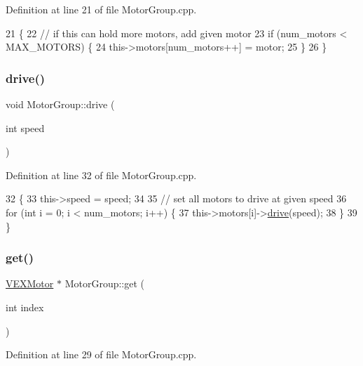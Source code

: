 Definition at line 21 of file Motor\+Group.\+cpp.


\begin{DoxyCode}
21                                     \{
22     \textcolor{comment}{// if this can hold more motors, add given motor}
23     \textcolor{keywordflow}{if} (num\_motors < MAX\_MOTORS) \{
24         this->motors[num\_motors++] = motor;
25     \}
26 \}
\end{DoxyCode}
\mbox{\label{class_motor_group_a0c2302784f8226542ded59b6812720ac}} 
\subsubsection{\texorpdfstring{drive()}{drive()}}
{\footnotesize\ttfamily void Motor\+Group\+::drive (\begin{DoxyParamCaption}\item[{int}]{speed }\end{DoxyParamCaption})}



Definition at line 32 of file Motor\+Group.\+cpp.


\begin{DoxyCode}
32                                 \{
33     this->speed = speed;
34 
35     \textcolor{comment}{// set all motors to drive at given speed}
36     \textcolor{keywordflow}{for} (\textcolor{keywordtype}{int} i = 0; i < num\_motors; i++) \{
37         this->motors[i]->\hyperlink{class_v_e_x_motor_ac8ab5c30e4be4a9e3ed290e7827bcf1a}{drive}(speed);
38     \}
39 \}
\end{DoxyCode}
\mbox{\label{class_motor_group_a5bb7e87231ada3770df40783a2c6afda}} 
\subsubsection{\texorpdfstring{get()}{get()}}
{\footnotesize\ttfamily \hyperlink{class_v_e_x_motor}{V\+E\+X\+Motor} $\ast$ Motor\+Group\+::get (\begin{DoxyParamCaption}\item[{int}]{index }\end{DoxyParamCaption})}



Definition at line 29 of file Motor\+Group.\+cpp.


